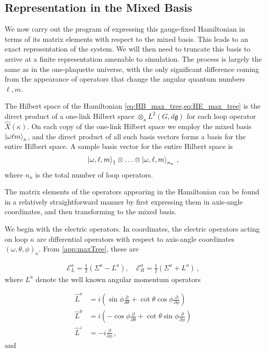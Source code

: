 \documentclass[reprint,superscriptaddress,pra,nofootinbib,preprintnumbers,floatfix]{revtex4-1}
\providecommand{\g}{{\mathfrak{g}}}
\begin{document}
\subsection{Representation in the Mixed Basis}
\label{sec:multi_plaq_mixed_basis}
We now carry out the program of expressing this gauge-fixed Hamiltonian in terms of its matrix elements with respect to the mixed basis. 
%
This leads to an exact representation of the system. 
%
We will then need to truncate this basis to arrive at a finite representation amenable to simulation. 
%
The process is largely the same as in the one-plaquette universe, with the only significant difference coming from the appearance of operators that change the angular quantum numbers $\ell,m$.

The Hilbert space of the Hamiltonian \cref{eq:HB_max_tree,eq:HE_max_tree} is the direct product of a one-link Hilbert space $\otimes_\kappa L^2(G,d\g)$ for each loop operator $\hat X(\kappa)$. 
%
On each copy of the one-link Hilbert space we employ the mixed basis $\ket{\omega \ell m}_{\kappa}$, and the direct product of all such basis vectors forms a basis for the entire Hilbert space. 
%
A sample basis vector for the entire Hilbert space is
%
\begin{align}
\ket{\omega,\ell,m}_{1} \otimes \hdots \otimes \ket{\omega,\ell,m}_{n_\kappa}
\,,
\end{align}
%
where $n_\kappa$ is the total number of loop operators.

The matrix elements of the operators appearing in the Hamiltonian can be found in a relatively straightforward manner by first expressing them in axis-angle coordinates, and then transforming to the mixed basis.

We begin with the electric operators. 
%
In coordinates, the electric operators acting on loop $\kappa$ are differential operators with respect to axis-angle coordinates $(\omega,\theta,\phi)_\kappa$. 
%
From \cref{app:maxTree}, these are 
%

\begin{align}
\label{eq:ELER_rel}
    \mathcal{E}^a_L = \frac{1}{2}(\Sigma^a - L^a), \quad \mathcal{E}^a_R = \frac{1}{2}(\Sigma^a + L^a)
    \,,
\end{align}
%
where $L^a$ denote the well known angular momentum operators 
%

\begin{align}
\label{eq:Lop}
    \hat L^x &= i \left( \sin\phi \frac{\partial}{d \theta} + \cot\theta \cos\phi \frac{\partial}{{\partial} \phi}\right)
    \nonumber\\
    \hat L^y &= i \left( -\cos\phi \frac{\partial}{{\partial} \theta} + \cot\theta \sin\phi \frac{\partial}{{\partial} \phi}\right)
    \nonumber\\
    \hat L^z &= -i \frac{\partial}{{\partial} \phi}
    \,,
\end{align}
%
and  
%
\end{document}
